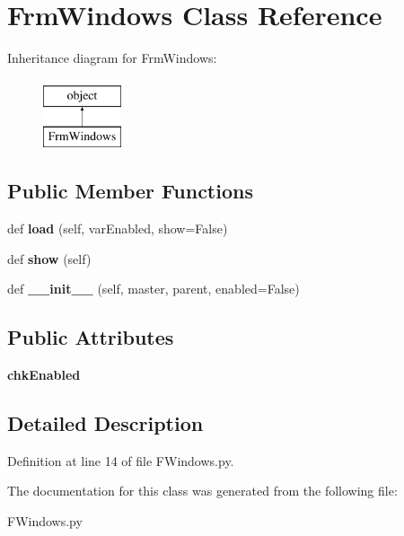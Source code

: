 \hypertarget{class_f_windows_1_1_frm_windows}{}\section{Frm\+Windows Class Reference}
\label{class_f_windows_1_1_frm_windows}
Inheritance diagram for Frm\+Windows\+:\begin{figure}[H]
\begin{center}
\leavevmode
\includegraphics[height=2.000000cm]{class_f_windows_1_1_frm_windows}
\end{center}
\end{figure}
\subsection*{Public Member Functions}
\begin{DoxyCompactItemize}
\item 
\mbox{\label{class_f_windows_1_1_frm_windows_a38f4c0a1b0b9f14e89e7670d417e140a}} 
def {\bfseries load} (self, var\+Enabled, show=False)
\item 
\mbox{\label{class_f_windows_1_1_frm_windows_ab4f4398c3f210fe4ea6e720401357691}} 
def {\bfseries show} (self)
\item 
\mbox{\label{class_f_windows_1_1_frm_windows_adffadd9833af4759460d71b7d00bbf4c}} 
def {\bfseries \+\_\+\+\_\+init\+\_\+\+\_\+} (self, master, parent, enabled=False)
\end{DoxyCompactItemize}
\subsection*{Public Attributes}
\begin{DoxyCompactItemize}
\item 
\mbox{\label{class_f_windows_1_1_frm_windows_aa5ba96b8972782a03e3d83def0f965a9}} 
{\bfseries chk\+Enabled}
\end{DoxyCompactItemize}


\subsection{Detailed Description}


Definition at line 14 of file F\+Windows.\+py.



The documentation for this class was generated from the following file\+:\begin{DoxyCompactItemize}
\item 
F\+Windows.\+py\end{DoxyCompactItemize}
